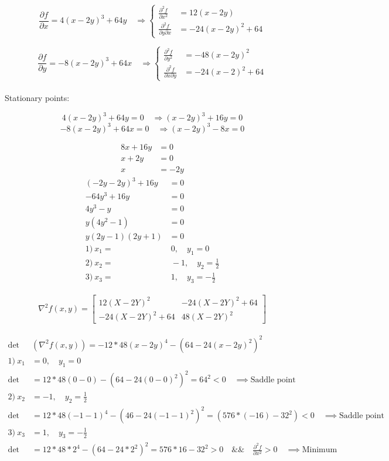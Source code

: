 \documentclass[12pt]{article}         %
\begin{document}
$$
\frac {\partial f}{\partial x} = 4(x-2y)^3 + 64y \quad\Rightarrow 
	\left\{
	\begin{aligned}
		\frac {\partial^2 f}{\partial x^2}&=12(x-2y)\\
		\frac {\partial^2 f}{\partial y \partial x}&=-24(x-2y)^2 +64
	 \end{aligned} 
	 \right.
$$

$$
\frac {\partial f}{\partial y} = -8(x-2y)^3 +64x \quad\Rightarrow 
	\left\{
	\begin{aligned}
		\frac {\partial^2 f}{\partial y^2}&=-48(x-2y)^2\\ 
		\frac {\partial^2 f}{\partial x \partial y}&=-24(x-2)^2 +64
	 \end{aligned} 
	 \right.
$$\\

Stationary points:

$$
4(x-2y)^3 +64y=0  \quad\Rightarrow 
(x-2y)^3 + 16y=0
$$
$$
-8(x-2y)^3+64x=0  \quad\Rightarrow
(x-2y)^3 -8x=0
$$

$$
\begin{aligned}
8x+16y&=0\\
x+2y&=0\\
x&=-2y
\end{aligned}
$$
$$
\begin{aligned}
(-2y -2y)^3 +16y&=0\\
-64y^3 +16y&=0\\
4y^3 -y&=0\\
y(4y^2 -1)&=0\\
y(2y-1)(2y+1)&=0\\
1)\: x_1=&\:0,\quad y_1=0\\
2)\: x_2=&\: -\!1,\quad y_2=\frac{1}{2}\\ 
3)\: x_3=&\:1,\quad y_3=-\frac{1}{2}
\end{aligned}
$$

\begin{gather}
\nabla^2 f(x,y) = 
  \begin{bmatrix}
  12 (X - 2Y)^2 &
  -24 (X - 2Y)^2 + 64\\
  -24 (X - 2Y)^2  +64 &
  48 (X - 2Y)^2 
   \end{bmatrix}
    \nonumber
\end{gather}


$$
\begin{aligned}
\det&\left(\nabla^2 f(x,y)\right)=-12*48(x-2y)^4 -(64-24(x-2y)^2)^2\\
1)\: x_1&=0, \quad y_1=0\\
\det&=12*48(0-0) - (64-24(0-0)^2)^2 =64^2 < 0   \quad\implies \text{Saddle point}\\
2)\: x_2&=-1, \quad y_2=\frac{1}{2}\\
\det&=12*48(-1-1)^4 -(46-24(-1-1)^2)^2=(576*(-16)-32^2)<0 \quad\implies \text{Saddle point}\\
3)\: x_3&=1, \quad y_3=-\frac{1}{2}\\
\det&=12*48*2^4 -(64 -24*2^2)^2 = 576*16-32^2>0 \quad \&\& \quad \frac {\partial^2 f}{\partial x^2} > 0 \quad\implies \text{Minimum}\\
\end{aligned}
$$
 \pagebreak
\end{document}

